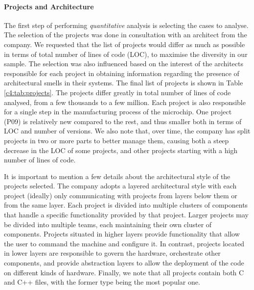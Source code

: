 \paragraph{Projects and Architecture}
The first step of performing \emph{quantitative} analysis is selecting the cases to analyse. 
The selection of the projects was done in consultation with an architect from the company. We requested that the list of projects would differ as much as possible in terms of total number of lines of code (LOC), to maximise the diversity in our sample.
The selection was also influenced based on the interest of the architects responsible for each project in obtaining information regarding the presence of architectural smells in their systems.
The final list of projects is shown in Table \ref{c4:tab:projects}.
The projects differ greatly in total number of lines of code analysed, from a few thousands to a few million. Each project is also responsible for a single step in the manufacturing process of the microchip.
One project (P09) is relatively new compared to the rest, and thus smaller both in terms of LOC and number of versions.
We also note that, over time, the company has split projects in two or more parts to better manage them, causing both a steep decrease in the LOC of some projects, and other projects starting with a high number of lines of code.

It is important to mention a few details about the architectural style of the projects selected. 
The company adopts a layered architectural style with each project (ideally) only communicating with projects from layers below them or from the same layer.
Each project is divided into multiple clusters of components that handle a specific functionality provided by that project. Larger projects may be divided into multiple teams, each maintaining their own cluster of components.
Projects situated in higher layers provide functionality that allow the user to command the machine and configure it.
In contrast, projects located in lower layers are responsible to govern the hardware, orchestrate other components, and provide abstraction layers to allow the deployment of the code on different kinds of hardware.
Finally, we note that all projects contain both C and C++ files, with the former type being the most popular one. 

